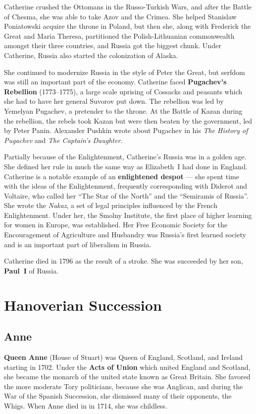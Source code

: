 Catherine crushed the Ottomans in the Russo-Turkish Wars,
and after the Battle of Chesma, she was able to take Azov and the Crimea.
She helped Stanislaw Poniatowski acquire the throne in Poland,
but then she, along with Frederick the Great and Maria Theresa,
partitioned the Polish-Lithuanian commonwealth amongst their three countries,
and Russia got the biggest chunk.
Under Catherine, Russia also started the colonization of Alaska.

She continued to modernize Russia in the style of Peter the Great,
but serfdom was still an important part of the economy.
Catherine faced \textbf{Pugachev's Rebellion} (1773--1775),
a large scale uprising of Cossacks and peasants which she had to have her general Suvorov put down.
The rebellion was led by Yemelyan Pugachev, a pretender to the throne.
At the Battle of Kazan during the rebellion,
the rebels took Kazan but were then beaten by the government, led by Peter Panin.
Alexander Pushkin wrote about Pugachev in his
\textit{The History of Pugachev} and \textit{The Captain's Daughter}.

Partially because of the Enlightenment, Catherine's Russia was in a golden age.
She defined her rule in much the same way as Elizabeth~I had done in England.
Catherine is a notable example of an \textbf{enlightened despot} ---
she spent time with the ideas of the Enlightenment, frequently corresponding with Diderot and Voltaire,
who called her ``The Star of the North'' and the ``Semiramis of Russia''.
She wrote the \textit{Nakaz}, a set of legal principles influenced by the French Enlightenment.
Under her, the Smolny Institute, the first place of higher learning for women in Europe, was established.
Her Free Economic Society for the Encouragement of Agriculture and Husbandry
was Russia's first learned society and is an important part of liberalism in Russia.

Catherine died in 1796 as the result of a stroke.
She was succeeded by her son, \textbf{Paul~I} of Russia.

\section{Hanoverian Succession}

\subsection*{Anne}

\textbf{Queen Anne} (House of Stuart) was Queen of England, Scotland, and Ireland starting in 1702.
Under the \textbf{Acts of Union} which united England and Scotland,
she became the monarch of the united state known as Great Britain.
She favored the more moderate Tory politicians, because she was Anglican,
and during the War of the Spanish Succession, she dismissed many of their opponents, the Whigs.
When Anne died in in 1714, she was childless.

